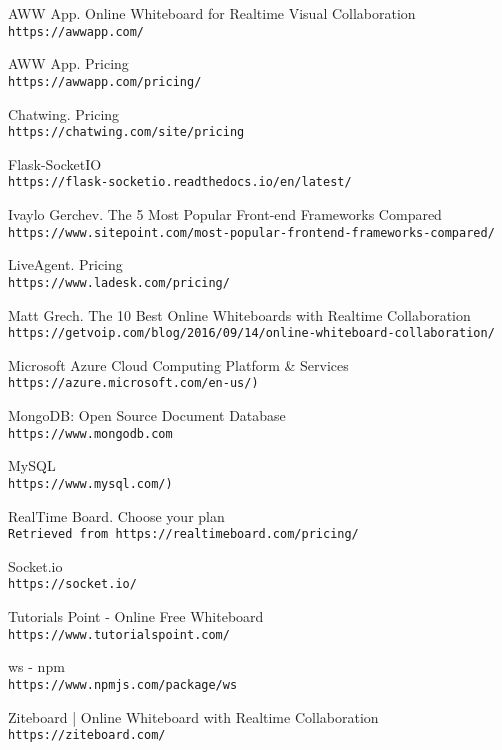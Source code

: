 \documentclass[10pt]{article}
\begin{document}
\begin{thebibliography}{9}

AWW App. Online Whiteboard for Realtime Visual Collaboration
\\\texttt{https://awwapp.com/}

AWW App. Pricing
\\\texttt{https://awwapp.com/pricing/}

Chatwing. Pricing
\\\texttt{https://chatwing.com/site/pricing}

Flask-SocketIO
\\\texttt{https://flask-socketio.readthedocs.io/en/latest/}

Ivaylo Gerchev. The 5 Most Popular Front-end Frameworks Compared
\\\texttt{https://www.sitepoint.com/most-popular-frontend-frameworks-compared/}

LiveAgent. Pricing
\\\texttt{https://www.ladesk.com/pricing/}

Matt Grech. The 10 Best Online Whiteboards with Realtime Collaboration
\\\texttt{https://getvoip.com/blog/2016/09/14/online-whiteboard-collaboration/}

Microsoft Azure Cloud Computing Platform \& Services
\\\texttt{https://azure.microsoft.com/en-us/)}

MongoDB: Open Source Document Database
\\\texttt{https://www.mongodb.com}

MySQL
\\\texttt{https://www.mysql.com/)}

RealTime Board. Choose your plan
\\\texttt{Retrieved from https://realtimeboard.com/pricing/}

Socket.io
\\\texttt{https://socket.io/}

Tutorials Point - Online Free Whiteboard
\\\texttt{https://www.tutorialspoint.com/}

ws - npm
\\\texttt{https://www.npmjs.com/package/ws}

Ziteboard | Online Whiteboard with Realtime Collaboration
\\\texttt{https://ziteboard.com/}

\end{thebibliography}
\end{document}
